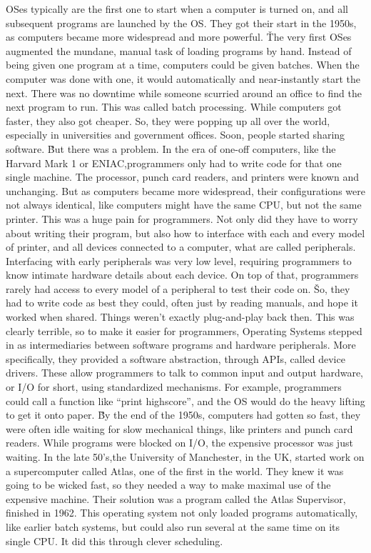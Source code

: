 OSes typically are the first one to start when a computer is turned on, and all subsequent programs are launched by
the OS. They got their start in the 1950s, as computers became more widespread and more powerful. \v

The very first OSes augmented the mundane, manual task of loading programs by hand. Instead of being given one
program at a time, computers could be given batches. When the computer was done with one, it would automatically and
near-instantly start the next. There was no downtime while someone scurried around an office to find the next program
to run. This was called batch processing. While computers got faster, they also got cheaper. So, they were popping up
all over the world, especially in universities and government offices. Soon, people started sharing software. \v

But there was a problem. In the era of one-off computers, like the Harvard Mark 1 or ENIAC,programmers only had to
write code for that one single machine. The processor, punch card readers, and printers were known and unchanging.
But as computers became more widespread, their configurations were not always identical, like computers might have
the same CPU, but not the same printer. This was a huge pain for programmers. Not only did they have to worry about
writing their program, but also how to interface with each and every model of printer, and all devices connected to a
computer, what are called peripherals. Interfacing with early peripherals was very low level, requiring programmers
to know intimate hardware details about each device. On top of that, programmers rarely had access to every model of
a peripheral to test their code on. \v

So, they had to write code as best they could, often just by reading manuals, and hope it worked when shared. Things
weren't exactly plug-and-play back then. This was clearly terrible, so to make it easier for programmers, Operating
Systems stepped in as intermediaries between software programs and hardware peripherals. More specifically, they
provided a software abstraction, through APIs, called device drivers. These allow programmers to talk to common input
and output hardware, or I/O for short, using standardized mechanisms. For example, programmers could call a function
like “print highscore”, and the OS would do the heavy lifting to get it onto paper. \v

By the end of the 1950s, computers had gotten so fast, they were often idle waiting for slow mechanical things, like
printers and punch card readers. While programs were blocked on I/O, the expensive processor was just waiting. In the
late 50's,the University of Manchester, in the UK, started work on a supercomputer called Atlas, one of the first in
the world. They knew it was going to be wicked fast, so they needed a way to make maximal use of the expensive
machine. Their solution was a program called the Atlas Supervisor, finished in 1962. This operating system not only
loaded programs automatically, like earlier batch systems, but could also run several at the same time on its single
CPU. It did this through clever scheduling.

